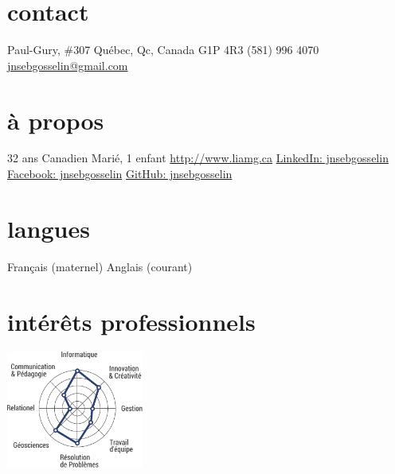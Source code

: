 \documentclass[]{friggeri-cv} %
\def\github{\color{gray}{\FA \faGithubSign}}
\def\facebook{\color{gray}{\FA \faFacebookSign}}
\def\linkedin{\color{gray}{\FA \faLinkedinSign}}
\def\phoneb{\color{gray}{\FA \faPhoneSign}}
\def\home{\color{gray}{\FA \faHome}}
\def\mail{\color{gray}{\FA \faEnvelopeAlt}}
\def\globe{\color{gray}{\FA \faGlobe}}
\begin{document}
%
%
%
\begin{aside} %
\section{contact}\vspace{5pt}
\home{} Paul-Gury, \#307
\hspace{0.43cm}Québec, Qc, Canada
\hspace{0.43cm}G1P 4R3\vspace{5pt}
\phoneb\space (581) 996 4070
\href{mailto:jnsebgosselin@gmail.com}{\mail\space jnsebgosselin@gmail.com}
\vspace{10pt}\section{à propos}\vspace{5pt}
32 ans
Canadien
Marié, 1 enfant\vspace{5pt}
\href{http://www.liamg.ca/qui-sommes-nous/jean-sebastien-gosselin/}{\globe\hspace{0.1cm} http://www.liamg.ca}
\href{https://www.linkedin.com/in/jnsebgosselin}{\linkedin\hspace{0.1cm} LinkedIn: jnsebgosselin}
\href{https://www.facebook.com/jnsebgosselin}{\facebook\hspace{0.1cm} Facebook: jnsebgosselin}
\href{https://github.com/jnsebgosselin}{\github\hspace{0.1cm} GitHub: jnsebgosselin}
%
\vspace{10pt}\section{langues}\vspace{5pt}
Français (maternel)
Anglais (courant)
%
\vspace{10pt}\section{intérêts professionnels}\vspace{10pt}
\includegraphics[width=4.5cm]{prof_interests_graph}

\end{aside}
\end{document}
